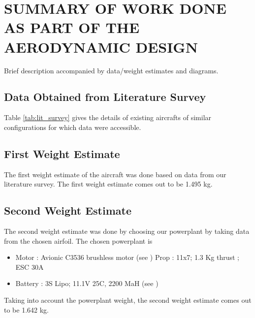 \section{SUMMARY OF WORK DONE AS PART OF THE AERODYNAMIC DESIGN}
%
Brief description accompanied by data/weight estimates and diagrams.
%
\subsection{Data Obtained from Literature Survey}
Table \ref{tab:lit_survey} gives the details of existing aircrafts of similar configurations for which data were accessible.
%
\begin{table}[H]
\begin{center}
\caption{Data of similar airplanes\cite{5}}
\label{tab:lit_survey}
\end{center}
\end{table}
%
\subsection{First Weight Estimate}
The first weight estimate of the aircraft was done based on data from our literature survey. The first weight estimate comes out to be 1.495 kg.
%
\subsection{Second Weight Estimate}
The second weight estimate was done by choosing our powerplant by taking data from the chosen airfoil. The chosen powerplant is 
\begin{itemize}
\item Motor : Avionic C3536 brushless motor (see \cite{1}) Prop : 11x7; 1.3 Kg thrust ; ESC 30A
\item Battery : 3S Lipo; 11.1V 25C, 2200 MaH (see \cite{2})
\end{itemize}
Taking into account the powerplant weight, the second weight estimate comes out to be 1.642 kg.
%
